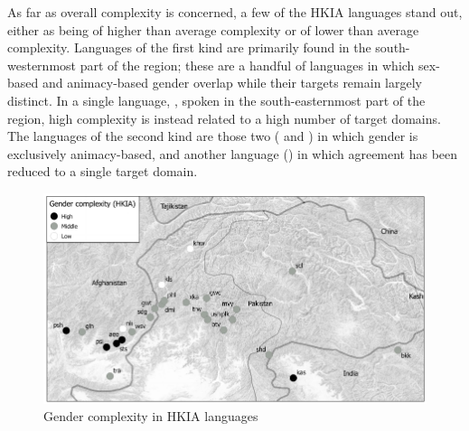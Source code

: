 \documentclass[output=collectionpaper]{langsci/langscibook}
\begin{document}
As far as overall complexity is concerned, a few of the HKIA languages stand out, either as being of higher than average complexity or of lower than average complexity. Languages of the first kind are primarily found in the south-westernmost part of the region; these are a handful of languages in which sex-based and animacy-based gender overlap while their targets remain largely distinct. In a single language, , spoken in the south-easternmost part of the region, high complexity is instead related to a high number of target domains. The languages of the second kind are those two ( and ) in which gender is exclusively animacy-based, and another language () in which agreement has been reduced to a single target domain.


\begin{figure}
\includegraphics[width=\textwidth]{figures/10/map3_2}
\caption{Gender complexity in HKIA languages}
\label{fig:Lilje:3}
\end{figure}
\end{document}
